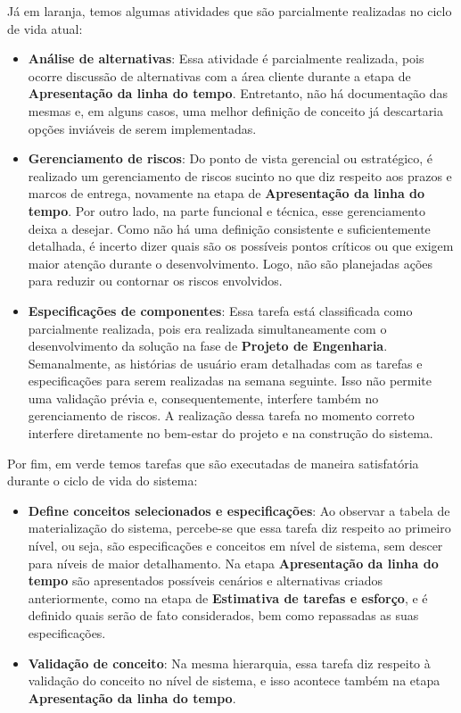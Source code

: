 	Já em laranja, temos algumas atividades que são parcialmente realizadas no ciclo de vida atual:
	\begin{itemize}
		\item \textbf{Análise de alternativas}: Essa atividade é parcialmente realizada, pois ocorre discussão de alternativas com a área cliente durante a etapa de \textbf{Apresentação da linha do tempo}. Entretanto, não há documentação das mesmas e, em alguns casos, uma melhor definição de conceito já descartaria opções inviáveis de serem implementadas.
		\item \textbf{Gerenciamento de riscos}: Do ponto de vista gerencial ou estratégico, é realizado um gerenciamento de riscos sucinto no que diz respeito aos prazos e marcos de entrega, novamente na etapa de \textbf{Apresentação da linha do tempo}. Por outro lado, na parte funcional e técnica, esse gerenciamento deixa a desejar. Como não há uma definição consistente e suficientemente detalhada, é incerto dizer quais são os possíveis pontos críticos ou que exigem maior atenção durante o desenvolvimento. Logo, não são planejadas ações para reduzir ou contornar os riscos envolvidos.
		\item \textbf{Especificações de componentes}: Essa tarefa está classificada como parcialmente realizada, pois era realizada simultaneamente com o desenvolvimento da solução na fase de \textbf{Projeto de Engenharia}. Semanalmente, as histórias de usuário eram detalhadas com as tarefas e especificações para serem realizadas na semana seguinte. Isso não permite uma validação prévia e, consequentemente, interfere também no gerenciamento de riscos. A realização dessa tarefa no momento correto interfere diretamente no bem-estar do projeto e na construção do sistema.
	\end{itemize}

	Por fim, em verde temos tarefas que são executadas de maneira satisfatória durante o ciclo de vida do sistema:
	\begin{itemize}
		\item \textbf{Define conceitos selecionados e especificações}: Ao observar a tabela de materialização do sistema, percebe-se que essa tarefa diz respeito ao primeiro nível, ou seja, são especificações e conceitos em nível de sistema, sem descer para níveis de maior detalhamento. Na etapa \textbf{Apresentação da linha do tempo} são apresentados possíveis cenários e alternativas criados anteriormente, como na etapa de \textbf{Estimativa de tarefas e esforço}, e é definido quais serão de fato considerados, bem como repassadas as suas especificações.
		\item \textbf{Validação de conceito}: Na mesma hierarquia, essa tarefa diz respeito à validação do conceito no nível de sistema, e isso acontece também na etapa \textbf{Apresentação da linha do tempo}.
	\end{itemize}

